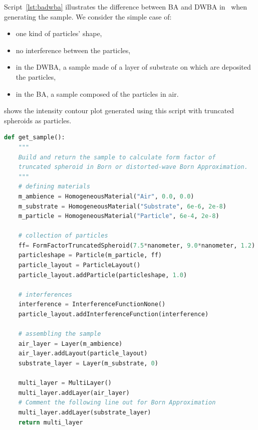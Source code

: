 Script~\ref{lst:badwba} illustrates the difference between BA and DWBA in \BornAgain\ when generating the sample.  We consider the simple case of:
\begin{itemize}
\item one kind of particles' shape,
\item no interference between the particles,
\item in the DWBA, a sample made of a layer of substrate on which are deposited the particles,
\item in the BA, a sample composed of the particles in air.
\end{itemize}

 shows the intensity contour plot generated using this script with truncated spheroids as particles.

\newpage

\begin{lstlisting}[language=python, style=eclipseboxed,numbers=none,nolol,caption={\Code{Python} script to generate a sample using Born (BA) or distorted-wave Born approximation (DWBA). The difference between BA and DWBA in this simple case is the absence or presence of a substrate layer in the sample.},label={lst:badwba}]
def get_sample():
    """
    Build and return the sample to calculate form factor of
    truncated spheroid in Born or distorted-wave Born Approximation.
    """
    # defining materials
    m_ambience = HomogeneousMaterial("Air", 0.0, 0.0)
    m_substrate = HomogeneousMaterial("Substrate", 6e-6, 2e-8)
    m_particle = HomogeneousMaterial("Particle", 6e-4, 2e-8)

    # collection of particles
    ff= FormFactorTruncatedSpheroid(7.5*nanometer, 9.0*nanometer, 1.2)
    particleshape = Particle(m_particle, ff)
    particle_layout = ParticleLayout()
    particle_layout.addParticle(particleshape, 1.0)

    # interferences
    interference = InterferenceFunctionNone()
    particle_layout.addInterferenceFunction(interference)

    # assembling the sample
    air_layer = Layer(m_ambience)
    air_layer.addLayout(particle_layout)
    substrate_layer = Layer(m_substrate, 0)

    multi_layer = MultiLayer()
    multi_layer.addLayer(air_layer)
    # Comment the following line out for Born Approximation
    multi_layer.addLayer(substrate_layer)
    return multi_layer
\end{lstlisting}



